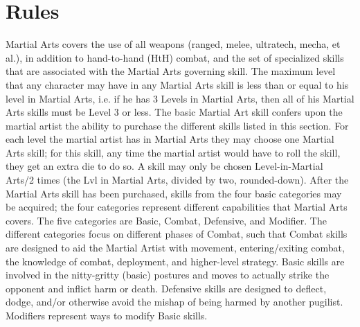 \documentclass[twoside]{book}
\begin{document}
\section{Rules}
      Martial Arts covers the use of all weapons (ranged,
             melee, ultratech, mecha, et al.), in addition to
             hand-to-hand (HtH) combat, and the set of specialized skills
             that are associated with the Martial Arts governing skill.
             The maximum level that any character may have in any Martial
             Arts skill is less than or equal to his level in Martial
             Arts, i.e. if he has 3 Levels in Martial Arts, then all of
             his Martial Arts skills must be Level 3 or less. The basic
             Martial Art skill confers upon the martial artist the
             ability to purchase the different skills listed in this
             section.   For each level the martial artist has in Martial Arts
             they may choose one Martial Arts skill; for this skill, any
             time the martial artist would have to roll the skill, they
             get an extra die to do so. A skill may only be chosen
             Level-in-Martial Arts/2 times (the Lvl in Martial Arts,
             divided by two, rounded-down). 
    After the Martial Arts skill has been purchased,
             skills from the four basic categories may be acquired; the
             four categories represent different capabilities that
             Martial Arts covers. The five categories are Basic, Combat,
             Defensive, and Modifier. The different categories focus on
             different phases of Combat, such that Combat skills are
             designed to aid the Martial Artist with movement,
             entering/exiting combat, the knowledge of combat,
             deployment, and higher-level strategy. Basic skills are
             involved in the nitty-gritty (basic) postures and moves to
             actually strike the opponent and inflict harm or death.
             Defensive skills are designed to deflect, dodge, and/or
             otherwise avoid the mishap of being harmed by another
             pugilist. Modifiers represent ways to modify Basic skills.
               
\end{document}
